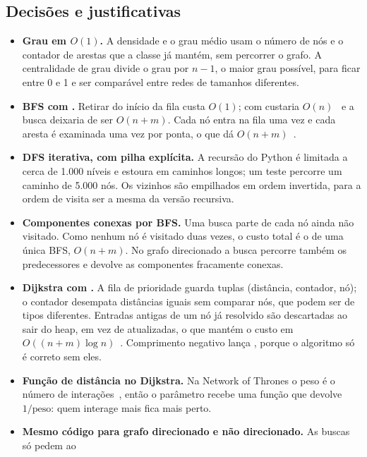 \subsection{Decisões e justificativas}
\begin{itemize}[leftmargin=*]
  \item \textbf{Grau em $O(1)$.} A densidade e o grau médio usam o número de nós e o contador de
        arestas que a classe  já mantém, sem percorrer o grafo. A centralidade de grau
        divide o grau por $n-1$, o maior grau possível, para ficar entre 0 e 1 e ser comparável entre
        redes de tamanhos diferentes.
  \item \textbf{BFS com .} Retirar do início da fila custa $O(1)$; com
         custaria $O(n)$~\cite{pythoncomplexidade} e a busca deixaria de ser
        $O(n+m)$. Cada nó entra na fila uma vez e cada aresta é examinada uma vez por ponta, o que
        dá $O(n+m)$~\cite{cormen2022}.
  \item \textbf{DFS iterativa, com pilha explícita.} A recursão do Python é limitada a cerca de
        1.000 níveis e estoura em caminhos longos; um teste percorre um caminho de 5.000 nós. Os
        vizinhos são empilhados em ordem invertida, para a ordem de visita ser a mesma da versão
        recursiva.
  \item \textbf{Componentes conexas por BFS.} Uma busca parte de cada nó ainda não visitado. Como
        nenhum nó é visitado duas vezes, o custo total é o de uma única BFS, $O(n+m)$. No grafo
        direcionado a busca percorre também os predecessores e devolve as componentes fracamente
        conexas.
  \item \textbf{Dijkstra com .} A fila de prioridade guarda tuplas (distância,
        contador, nó); o contador desempata distâncias iguais sem comparar nós, que podem ser de
        tipos diferentes. Entradas antigas de um nó já resolvido são descartadas ao sair do heap, em
        vez de atualizadas, o que mantém o custo em $O((n+m)\log n)$~\cite{dijkstra1959,cormen2022}.
        Comprimento negativo lança , porque o algoritmo só é correto sem eles.
  \item \textbf{Função de distância no Dijkstra.} Na Network of Thrones o peso é o número de
        interações~\cite{beveridge2016}, então o parâmetro  recebe uma
        função que devolve $1/\text{peso}$: quem interage mais fica mais perto.
  \item \textbf{Mesmo código para grafo direcionado e não direcionado.} As buscas só pedem ao

\end{itemize}
